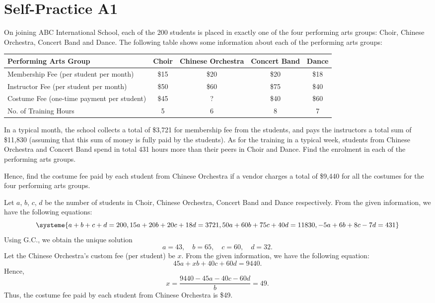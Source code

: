 \section{Self-Practice A1}

\begin{problem}
    On joining ABC International School, each of the 200 students is placed in exactly one of the four performing arts groups: Choir, Chinese Orchestra, Concert Band and Dance. The following table shows some information about each of the performing arts groups:

    \begin{table}[H]
        \centering
        \begin{tabularx}{\textwidth}{|>{\centering}X|c|c|c|c|}
        \hline
        \textbf{Performing Arts Group} & \textbf{Choir} & \textbf{Chinese Orchestra} & \textbf{Concert Band} & \textbf{Dance} \\ \hline
        Membership Fee (per student per month) & \$15 & \$20 & \$20 & \$18 \\ \hline
        Instructor Fee (per student per month) & \$50 & \$60 & \$75 & \$40 \\ \hline
        Costume Fee (one-time payment per student) & \$45 & ? & \$40 & \$60 \\ \hline
        No. of Training Hours & 5 & 6 & 8 & 7 \\ \hline
        \end{tabularx}
    \end{table}

    In a typical month, the school collects a total of \$3,721 for membership fee from the students, and pays the instructors a total sum of \$11,830 (assuming that this sum of money is fully paid by the students). As for the training in a typical week, students from Chinese Orchestra and Concert Band spend in total 431 hours more than their peers in Choir and Dance. Find the enrolment in each of the performing arts groups.

    Hence, find the costume fee paid by each student from Chinese Orchestra if a vendor charges a total of \$9,440 for all the costumes for the four performing arts groups.
\end{problem}
\begin{solution}
    Let $a$, $b$, $c$, $d$ be the number of students in Choir, Chinese Orchestra, Concert Band and Dance respectively. From the given information, we have the following equations: \[\systeme{a+b+c+d=200,15a + 20b + 20c + 18d = 3721,50a+60b+75c+40d=11830,-5a+6b+8c-7d=431}\] Using G.C., we obtain the unique solution \[a = 43, \quad b = 65, \quad c = 60, \quad d = 32.\] Let the Chinese Orchestra's custom fee (per student) be $x$. From the given information, we have the following equation: \[45a + xb + 40c + 60d = 9440.\] Hence, \[x = \frac{9440 - 45a - 40c - 60d}{b} = 49.\] Thus, the costume fee paid by each student from Chinese Orchestra is \$49.
\end{solution}

